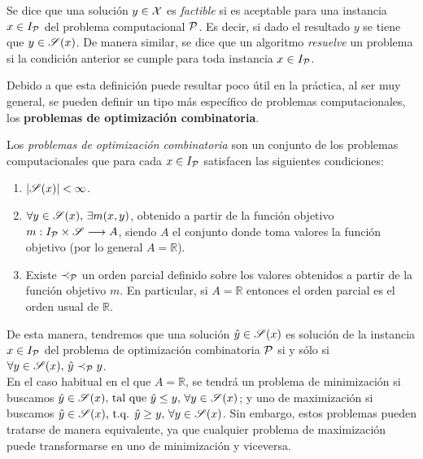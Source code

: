 \begin{definition}
    Se dice que una solución $y\in\mathcal{X}$ es \textit{factible} si es aceptable para una instancia $x\in I_{\mathcal{P}}$ del problema computacional $\mathcal{P}$. Es decir, si dado el resultado $y$ se tiene que $y \in \mathscr{S}(x)$. De manera similar, se dice que un algoritmo \textit{resuelve} un problema si la condición anterior se cumple para toda instancia $x\in I_{\mathcal{P}}$.
\end{definition}

Debido a que esta definición puede resultar poco útil en la práctica, al ser muy general, se pueden definir un tipo más específico de problemas computacionales, los \textbf{problemas de optimización combinatoria}.

\begin{definition}
    Los \textit{problemas de optimización combinatoria} son un conjunto de los problemas computacionales que para cada $x\in I_{\mathcal{P}}$ satisfacen las siguientes condiciones:
\begin{enumerate}
    \item $|\mathscr{S}(x)|<\infty$.
    \item $\forall y \in \mathscr{S}(x),\, \exists m(x,y)$, obtenido a partir de la función objetivo $m:I_{\mathcal{P}}\times\mathscr{S}\longrightarrow A$, siendo $A$ el conjunto donde toma valores la función objetivo (por lo general $A=\mathbb{R}$).
    \item Existe $\prec_{\mathcal{P}}$ un orden parcial definido sobre los valores obtenidos a partir de la función objetivo $m$. En particular, si $A=\mathbb{R}$ entonces el orden parcial es el orden usual de $\mathbb{R}$.
\end{enumerate}
\end{definition} 

De esta manera, tendremos que una solución $\hat{y}\in\mathscr{S}(x)$ es solución de la instancia $x\in I_{\mathcal{P}}$ del problema de optimización combinatoria $\mathcal{P}$ si y sólo si $\forall y \in \mathscr{S}(x),\, \hat{y}\prec_{\mathcal{P}} y$.\\

En el caso habitual en el que $A=\mathbb{R}$, se tendrá un problema de minimización si buscamos $\hat{y}\in\mathscr{S}(x)\text{, tal que }\hat{y}\leq y, \,\forall y \in \mathscr{S}(x)$; y uno de maximización si buscamos $\hat{y}\in\mathscr{S}(x)\text{, t.q. }\hat{y}\geq y, \,\forall y \in \mathscr{S}(x)$. Sin embargo, estos problemas pueden tratarse de manera equivalente, ya que cualquier problema de maximización puede transformarse en uno de minimización y viceversa.\\

